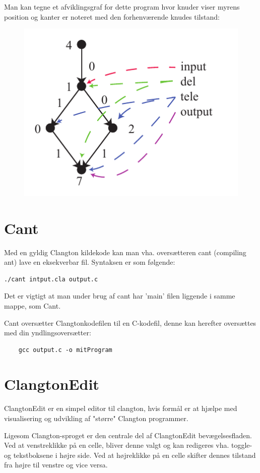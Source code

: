 \documentclass[11pt]{article}
\begin{document}
Man kan tegne et afviklingsgraf for dette program hvor knuder viser myrens position og kanter er noteret med den forhenværende knudes tilstand:

\begin{figure}[h]
\centering
\includegraphics[scale=1]{graph}%
\end{figure}

\section{Cant}
Med en gyldig Clangton kildekode kan man vha. oversætteren cant (compiling ant) lave en eksekverbar fil. Syntaksen er som følgende:

\begin{verbatim}
./cant intput.cla output.c
\end{verbatim}

Det er vigtigt at man under brug af cant har 'main' filen liggende i samme mappe, som Cant. 

Cant oversætter Clangtonkodefilen til en C-kodefil, denne kan herefter oversættes med din yndlingsoversætter:

\begin{verbatim}
	gcc output.c -o mitProgram
\end{verbatim}

\section{ClangtonEdit}
ClangtonEdit er en simpel editor til clangton, hvis formål er at hjælpe med visualisering og udvikling af "større" Clangton programmer.

Ligesom Clangton-sproget er den centrale del af ClangtonEdit bevægelsesfladen. Ved at venstreklikke på en celle, bliver denne valgt og kan redigeres vha. toggle- og tekstboksene i højre side. Ved at højreklikke på en celle skifter dennes tilstand fra højre til venstre og vice versa.
\end{document}
